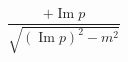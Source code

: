 \documentclass{minimal}
\renewcommand\Im{\operatorname{Im}}
\begin{document}
$$\frac{+\Im p}{\sqrt{(\Im p)^2 - m^2}}$$
\end{document}
